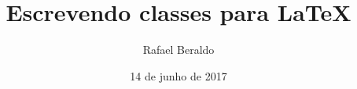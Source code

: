 \documentclass[green]{colorida}
\title{Escrevendo classes para \LaTeX}
\author{Rafael Beraldo}
\date{14 de junho de 2017}
\begin{document}
\frenchspacing
\maketitle
\blindtext
\end{document}
